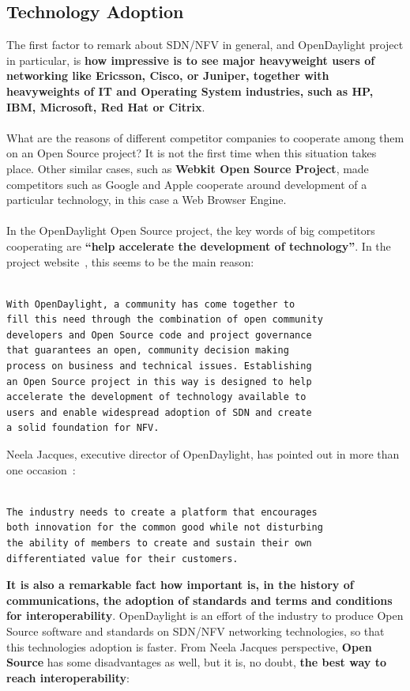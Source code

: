 \documentclass[a4paper, 12pt]{book}
\begin{document}
\subsection{Technology Adoption}
The first factor to remark about SDN/NFV in general, and OpenDaylight project in particular, is \textbf{how impressive is to see major heavyweight users of networking like Ericsson, Cisco, or Juniper, together with heavyweights of IT and Operating System industries, such as HP, IBM, Microsoft, Red Hat or Citrix}.\\
\\
What are the reasons of different competitor companies to cooperate among them on an Open Source project? It is not the first time when this situation takes place. Other similar cases, such as \textbf{Webkit Open Source Project}, made competitors such as Google and Apple cooperate around development of a particular technology, in this case a Web Browser Engine.\\
\\
In the OpenDaylight Open Source project, the key words of big competitors cooperating are \textbf{``help accelerate the development of technology''}. In the project website~\cite{OpenDaylightAbout}, this seems to be the main reason:
\begin{verbatim}

With OpenDaylight, a community has come together to
fill this need through the combination of open community
developers and Open Source code and project governance
that guarantees an open, community decision making
process on business and technical issues. Establishing
an Open Source project in this way is designed to help
accelerate the development of technology available to
users and enable widespread adoption of SDN and create
a solid foundation for NFV.

\end{verbatim}
Neela Jacques, executive director of OpenDaylight, has pointed out in more than one occasion~\cite{NFVZoneOpenDaylight}:
\begin{verbatim}

The industry needs to create a platform that encourages
both innovation for the common good while not disturbing
the ability of members to create and sustain their own
differentiated value for their customers.

\end{verbatim}
\textbf{It is also a remarkable fact how important is, in the history of communications, the adoption of standards and terms and conditions for interoperability}. OpenDaylight is an effort of the industry to produce Open Source software and standards on SDN/NFV networking technologies, so that this technologies adoption is faster. From Neela Jacques perspective, \textbf{Open Source} has some disadvantages as well, but it is, no doubt, \textbf{the best way to reach interoperability}:
\end{document}
